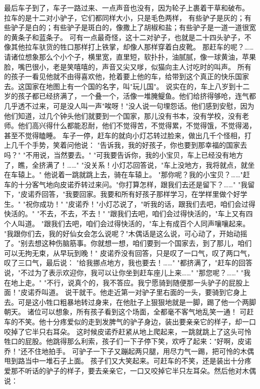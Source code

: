 \documentclass[12pt,UTF8]{ctexbook}
\begin{document}
最后车子到了，车子一路过来、一点声音也没有，因为轮子上裹着干草和破布。
拉车的是十二对小驴子，它们都同样大小，只是毛色两样，
有些驴子是灰的；有些驴子是白的；有些驴子是斑白的，像撒上了胡椒和盐；有些驴子是一道一道很宽的黄条子和蓝条子。
可有一点最奇怪，这十二对驴子，也就是二十四头驴子，不像其他拉车驮货的牲口那样打上铁掌，却像人那样穿着白皮靴。
那赶车的呢？……
请诸位想象那么个小个子，横里宽，直里短，软扑扑，油腻腻，像一球黄油，苹果脸，嘴巴很小，老是笑嘻嘻的，声音又尖又嗲，似猫向主人讨吃时的叫声。
所有的孩子一看见他就不由得喜欢他，抢着要上他的车，给带到这个真正的快乐国家去。这国家在地图上有一个国的名字，叫"玩儿国"。
说实在的，车上八岁到十二岁的孩子都已经挤满了，一个叠一个，活像一堆腌鳀鱼。他们给挤得够呛，连气都几乎透不过来，可是没人叫一声"唉呀！"没人说一句埋怨话。他们感到安慰，因为他们知道，过几个钟头他们就要到一个国家，那儿没有书本，没有学校，没有老师。他们高兴得什么都能忍耐，他们不觉得苦，不觉得累，不觉得饿，不觉得渴，甚至不觉得瞌睡。
车子一停，赶车的就向小灯芯转过脸来，做出几千个怪相，打上几千个手势，笑着问他说：
"告诉我，我的好孩子，你也要到那幸福的国家去吗？"
"不用说，当然要去。"
"可我要告诉你，我的小宝贝，车上已经没有地方了，瞧，全挤满了！……"
"没关系！小灯芯回答说，"车上没地方，我将就点，就坐在车辕上。"
他说着一跳就跳上去，骑在车辕上。
"那你呢？我的小宝贝？……"赶车的十分客气地向皮诺乔转过来问。"你打算怎样，跟我们去还是留下？……"
"我留下，"皮诺乔回答，"我要回家。我要和所有好孩子那样学习，在学样里做个好学生。"
"祝你成功！"
"皮诺乔！"小灯芯说了，"听我的话，跟我们去吧，咱们会过得快活的。"
"不去，不去，不去！"
"跟我们去吧，咱们会过得快活的，"车上又有四个人叫道。
"跟我们去吧，咱们会过得快活的，"车上有成百个人同声嚷嚷起来。
"我跟你们去，我的好仙女会怎么说呢？"木偶话是这么说，可心动了，开始动摇了。"别去想这种伤脑筋事。你就想一想，咱们要到一个国家去，到了那儿，咱们可以无拘无束，从早玩到晚！"
皮诺乔没有回答，只是叹了一口气，叹了两口气，叹了三口气，最后说：
"给我挪点地方，我也要去！……"
"都挤满了，"赶车的回答说，"不过为了表示欢迎你，我可以让你坐到赶车座儿上来……"
"那您呢？……"
"我在地上走。"
"不行，说真个的，我不答应。我宁愿骑到随便那一头驴子的屁股上面！"皮诺乔叫道。
说干就干。他走近第一对驴子里右面的一头，要骑到它身上去。可是这小牲口粗暴地转过身来，在他肚子上狠狠地就是一脚，踢了他一个两脚朝天。
诸位可以想象，所有孩子看到这个场面，全都毫不客气地乱笑一通！
可赶车的不笑。他十分疼爱似的走到发脾气的驴子身边，装出要亲亲它的样子，却一口咬掉了它半只右耳朵。
这时候皮诺乔赶紧从地上爬起来，一跳就跳上了这头可怜牲口的屁股。他跳得那么利索，孩子们一下子停下笑，欢呼了起来："好啊，皮诺乔！"还不住地拍手。
可驴子一下子又蹦起两只腿，用尽力气一踢，把可怜的木偶甩到路当中一堆石子上面。
孩子们又大笑起来。可赶车的不笑，还是装出十分疼爱那不听话的驴子的样子，要去亲亲它，一口又咬掉它半只左耳朵。然后他对木偶说：
\end{document}
